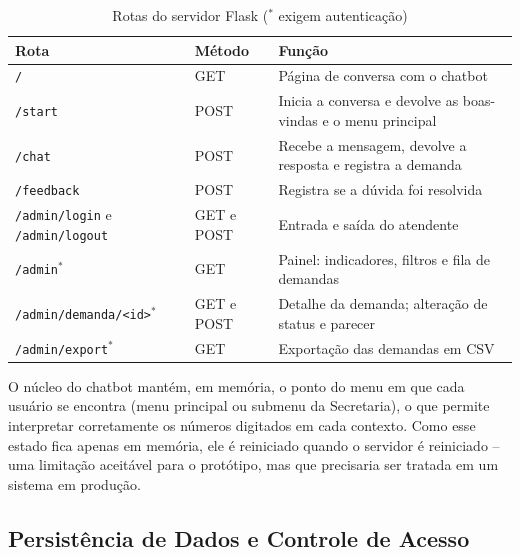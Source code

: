 \documentclass[12pt]{article}
\begin{document}
\begin{table}[H]
  \centering
  \begin{tabular}{|p{}|p{}|p{}|}
    \hline
    \textbf{Rota} & \textbf{Método} & \textbf{Função} \\ \hline
    \texttt{/} & GET & Página de conversa com o chatbot \\ \hline
    \texttt{/start} & POST & Inicia a conversa e devolve as boas-vindas e o menu
    principal \\ \hline
    \texttt{/chat} & POST & Recebe a mensagem, devolve a resposta e registra a
    demanda \\ \hline
    \texttt{/feedback} & POST & Registra se a dúvida foi resolvida \\ \hline
    \texttt{/admin/login} e \texttt{/admin/logout} & GET e POST & Entrada e
    saída do atendente \\ \hline
    \texttt{/admin}$^{*}$ & GET & Painel: indicadores, filtros e fila de demandas \\ \hline
    \texttt{/admin/demanda/<id>}$^{*}$ & GET e POST & Detalhe da demanda;
    alteração de status e parecer \\ \hline
    \texttt{/admin/export}$^{*}$ & GET & Exportação das demandas em CSV \\ \hline
  \end{tabular}
  \caption{Rotas do servidor Flask ($^{*}$ exigem autenticação)}
  \label{tab:rotas}
\end{table}

O núcleo do chatbot mantém, em memória, o ponto do menu em que cada usuário se
encontra (menu principal ou submenu da Secretaria), o que permite interpretar
corretamente os números digitados em cada contexto. Como esse estado fica
apenas em memória, ele é reiniciado quando o servidor é reiniciado -- uma
limitação aceitável para o protótipo, mas que precisaria ser tratada em um
sistema em produção.

\subsection{Persistência de Dados e Controle de Acesso}\label{sec:dados}
\end{document}
